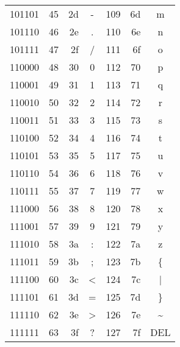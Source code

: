 \begin{tabular*}{\linewidth}{@{\extracolsep{\fill}}C|RRC|RRC}
    101101 & 45  & 2d  & -     & 109 & 6d  & m                \\
    101110 & 46  & 2e  & .     & 110 & 6e  & n                \\
    101111 & 47  & 2f  & /     & 111 & 6f  & o                \\
    110000 & 48  & 30  & 0     & 112 & 70  & p                \\
    110001 & 49  & 31  & 1     & 113 & 71  & q                \\
    110010 & 50  & 32  & 2     & 114 & 72  & r                \\
    110011 & 51  & 33  & 3     & 115 & 73  & s                \\
    110100 & 52  & 34  & 4     & 116 & 74  & t                \\
    110101 & 53  & 35  & 5     & 117 & 75  & u                \\
    110110 & 54  & 36  & 6     & 118 & 76  & v                \\
    110111 & 55  & 37  & 7     & 119 & 77  & w                \\
    111000 & 56  & 38  & 8     & 120 & 78  & x                \\
    111001 & 57  & 39  & 9     & 121 & 79  & y                \\
    111010 & 58  & 3a  & :     & 122 & 7a  & z                \\
    111011 & 59  & 3b  & ;     & 123 & 7b  & \{               \\
    111100 & 60  & 3c  & <     & 124 & 7c  & |                \\
    111101 & 61  & 3d  & =     & 125 & 7d  & \}               \\
    111110 & 62  & 3e  & >     & 126 & 7e  & \textasciitilde  \\
    111111 & 63  & 3f  & ?     & 127 & 7f  & DEL              \\
    \bottomrule
\end{tabular*}
